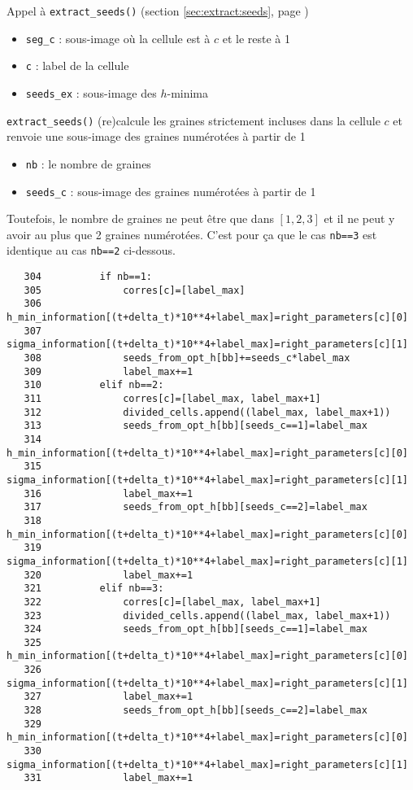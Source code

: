\documentclass{article}
\def \mycolor {red}
\begin{document}
\color{\mycolor}
Appel \`a \texttt{extract\_seeds()} (section \ref{sec:extract:seeds}, page \pageref{sec:extract:seeds})
\begin{itemize}
\itemsep -1ex
\item \verb|seg_c| : sous-image o\`u la cellule est \`a $c$ et le reste \`a 1
\item \verb|c| : label de la cellule
\item \verb|seeds_ex| : sous-image des $h$-minima
\end{itemize}
\texttt{extract\_seeds()} (re)calcule les graines strictement incluses dans la cellule $c$ et renvoie une sous-image des graines num\'erot\'ees \`a partir de 1
\begin{itemize}
\itemsep -1ex
\item \verb|nb| : le nombre de graines
\item \verb|seeds_c| : sous-image des graines num\'erot\'ees \`a partir de 1
\end{itemize}
Toutefois, le nombre de graines ne peut \^etre que dans $[1,2,3]$ et il ne peut y avoir au plus que 2 graines num\'erot\'ees. C'est pour \c{c}a que le cas \verb|nb==3| est identique au cas \verb|nb==2| ci-dessous.
\color{black}
\begin{verbatim}   
   304	        if nb==1:
   305	            corres[c]=[label_max]
   306	            h_min_information[(t+delta_t)*10**4+label_max]=right_parameters[c][0]
   307	            sigma_information[(t+delta_t)*10**4+label_max]=right_parameters[c][1]
   308	            seeds_from_opt_h[bb]+=seeds_c*label_max
   309	            label_max+=1
   310	        elif nb==2:
   311	            corres[c]=[label_max, label_max+1]
   312	            divided_cells.append((label_max, label_max+1))
   313	            seeds_from_opt_h[bb][seeds_c==1]=label_max
   314	            h_min_information[(t+delta_t)*10**4+label_max]=right_parameters[c][0]
   315	            sigma_information[(t+delta_t)*10**4+label_max]=right_parameters[c][1]
   316	            label_max+=1
   317	            seeds_from_opt_h[bb][seeds_c==2]=label_max
   318	            h_min_information[(t+delta_t)*10**4+label_max]=right_parameters[c][0]
   319	            sigma_information[(t+delta_t)*10**4+label_max]=right_parameters[c][1]
   320	            label_max+=1
   321	        elif nb==3:
   322	            corres[c]=[label_max, label_max+1]
   323	            divided_cells.append((label_max, label_max+1))
   324	            seeds_from_opt_h[bb][seeds_c==1]=label_max
   325	            h_min_information[(t+delta_t)*10**4+label_max]=right_parameters[c][0]
   326	            sigma_information[(t+delta_t)*10**4+label_max]=right_parameters[c][1]
   327	            label_max+=1
   328	            seeds_from_opt_h[bb][seeds_c==2]=label_max
   329	            h_min_information[(t+delta_t)*10**4+label_max]=right_parameters[c][0]
   330	            sigma_information[(t+delta_t)*10**4+label_max]=right_parameters[c][1]
   331	            label_max+=1
\end{verbatim} 
\end{document}
